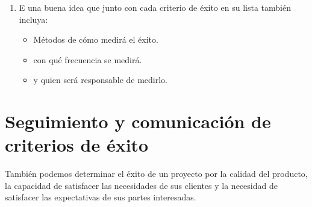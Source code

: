 \documentclass[10pt]{book}
\begin{document}
\begin{enumerate}
		\item E una buena idea que junto con cada criterio de éxito en su lista también incluya:
		    \begin{itemize}
			\item Métodos de cómo medirá el éxito.
			\item con qué frecuencia se medirá.
			\item y quien será responsable de medirlo.
		    \end{itemize}
	    \end{enumerate}

    \section{Seguimiento y comunicación de criterios de éxito}
    También podemos determinar el éxito de un proyecto por la calidad del producto, la capacidad de satisfacer las necesidades de sus clientes y la necesidad de satisfacer las expectativas de sus partes interesadas. 
\end{document}
